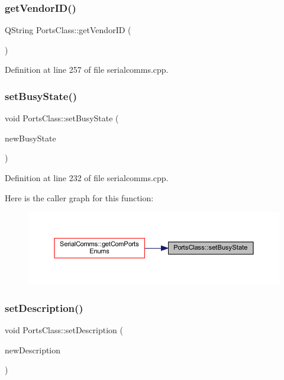 \subsubsection{\texorpdfstring{getVendorID()}{getVendorID()}}
{\footnotesize\ttfamily Q\+String Ports\+Class\+::get\+Vendor\+ID (\begin{DoxyParamCaption}{ }\end{DoxyParamCaption})}



Definition at line 257 of file serialcomms.\+cpp.

\mbox{\label{class_ports_class_ad416a34e1604ee80c1aa3f45ac5b1d2c}} 
\subsubsection{\texorpdfstring{setBusyState()}{setBusyState()}}
{\footnotesize\ttfamily void Ports\+Class\+::set\+Busy\+State (\begin{DoxyParamCaption}\item[{Q\+String}]{new\+Busy\+State }\end{DoxyParamCaption})}



Definition at line 232 of file serialcomms.\+cpp.

Here is the caller graph for this function\+:
\nopagebreak
\begin{figure}[H]
\begin{center}
\leavevmode
\includegraphics[width=350pt]{class_ports_class_ad416a34e1604ee80c1aa3f45ac5b1d2c_icgraph}
\end{center}
\end{figure}
\mbox{\label{class_ports_class_a2f06af1956265d0079be56b9b85c3a0f}} 
\subsubsection{\texorpdfstring{setDescription()}{setDescription()}}
{\footnotesize\ttfamily void Ports\+Class\+::set\+Description (\begin{DoxyParamCaption}\item[{Q\+String}]{new\+Description }\end{DoxyParamCaption})}



